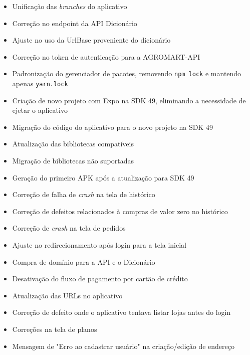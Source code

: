 \begin{itemize}
    \item Unificação das \textit{branches} do aplicativo
    \item Correção no endpoint da API Dicionário
    \item Ajuste no uso da UrlBase proveniente do dicionário
    \item Correção no token de autenticação para a AGROMART-API
    \item Padronização do gerenciador de pacotes, removendo \texttt{npm lock} e mantendo apenas \texttt{yarn.lock}
    \item Criação de novo projeto com Expo na SDK 49, eliminando a necessidade de ejetar o aplicativo
    \item Migração do código do aplicativo para o novo projeto na SDK 49
    \item Atualização das bibliotecas compatíveis
    \item Migração de bibliotecas não suportadas
    \item Geração do primeiro APK após a atualização para SDK 49
    \item Correção de falha de \textit{crash} na tela de histórico
    \item Correção de defeitos relacionados à compras de valor zero no histórico
    \item Correção de \textit{crash} na tela de pedidos
    \item Ajuste no redirecionamento após login para a tela inicial
    \item Compra de domínio para a API e o Dicionário
    \item Desativação do fluxo de pagamento por cartão de crédito
    \item Atualização das URLs no aplicativo
    \item Correção de defeito onde o aplicativo tentava listar lojas antes do login
    \item Correções na tela de planos
    \item Mensagem de "Erro ao cadastrar usuário" na criação/edição de endereço
\end{itemize}

